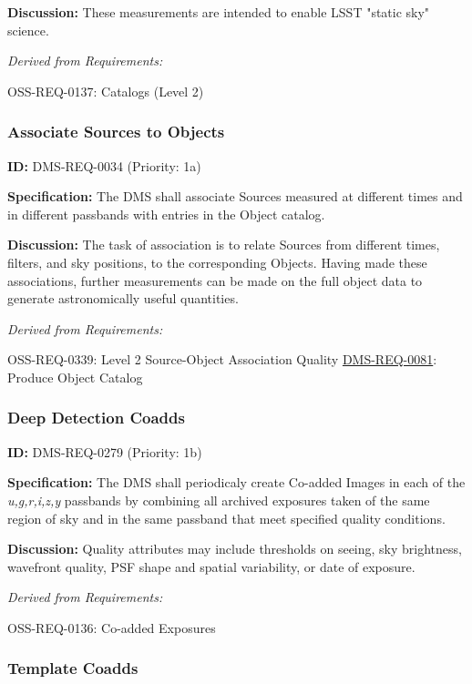 \documentclass[SE,toc,lsstdraft]{lsstdoc}
\begin{document}
\textbf{Discussion: }These measurements are intended to enable LSST "static sky" science.

\emph{Derived from Requirements:}

OSS-REQ-0137:
Catalogs (Level 2) \newline

\subsubsection{Associate Sources to Objects}

\label{DMS-REQ-0034}
\textbf{ID:} DMS-REQ-0034 (Priority: 1a)

\textbf{Specification:} The DMS shall associate Sources measured at different times and in different passbands with entries in the Object catalog.

\textbf{Discussion:} The task of association is to relate Sources from different times, filters, and sky positions, to the corresponding Objects. Having made these associations, further measurements can be made on the full object data to generate astronomically useful quantities.

\emph{Derived from Requirements:}

OSS-REQ-0339:
Level 2 Source-Object Association Quality \newline
\hyperref[DMS-REQ-0081]{DMS-REQ-0081}:
Produce Object Catalog \newline

\subsubsection{Deep Detection Coadds}

\label{DMS-REQ-0279}
\textbf{ID:} DMS-REQ-0279 (Priority: 1b)

\textbf{Specification:} The DMS shall periodicaly create Co-added Images in each of the \textit{u,g,r,i,z,y} passbands by combining all archived exposures taken of the same region of sky and in the same passband that meet specified quality conditions.

\textbf{Discussion: }Quality attributes may include thresholds on seeing, sky brightness, wavefront quality, PSF shape and spatial variability, or date of exposure.

\emph{Derived from Requirements:}

OSS-REQ-0136:
Co-added Exposures \newline

\subsubsection{Template Coadds}
\end{document}

